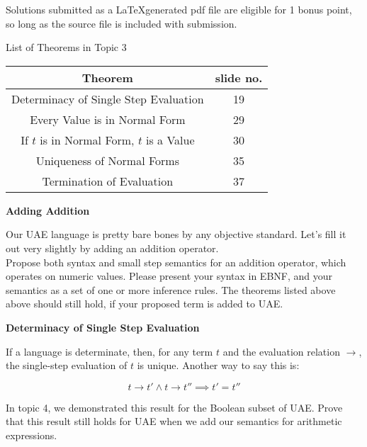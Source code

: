 \documentclass{exam}
\begin{document}
\begin{center}
\end{center}

Solutions submitted as a \LaTeX generated pdf file are eligible for 1 bonus point, so long as the source file is included with submission.  
\begin{center}

List of Theorems in Topic 3 \\
\begin{tabular}{| c | c |}
\hline
Theorem & slide no. \\ \hline
Determinacy of Single Step Evaluation & 19 \\ \hline
Every Value is in Normal Form & 29 \\ \hline
If $t$ is in Normal Form, $t$ is a Value & 30 \\ \hline
Uniqueness of Normal Forms & 35 \\ \hline
Termination of Evaluation & 37 \\ \hline
\end{tabular}

\end{center}

\begin{questions}
\question[10] \textbf{Adding Addition}

Our UAE language is pretty bare bones by any objective standard.  Let's fill it out very slightly by adding an addition operator.  \\ 

Propose both syntax and small step semantics for an addition operator, which operates on numeric values.  Please present your syntax in EBNF, and your semantics as a set of one or more inference rules.  The theorems listed above above should still hold, if your proposed term is added to UAE.  

\question[15] \textbf{Determinacy of Single Step Evaluation}

If a language is determinate, then, for any term $t$ and the evaluation relation $\rightarrow$, the single-step evaluation of $t$ is unique.  Another way to say this is: 

\begin{equation}
t \rightarrow t' \land t \rightarrow t'' \implies t' = t''
\end{equation}

In topic 4, we demonstrated this result for the Boolean subset of UAE.  Prove that this result still holds for UAE when we add our semantics for arithmetic expressions.    

\end{questions}
\end{document}
